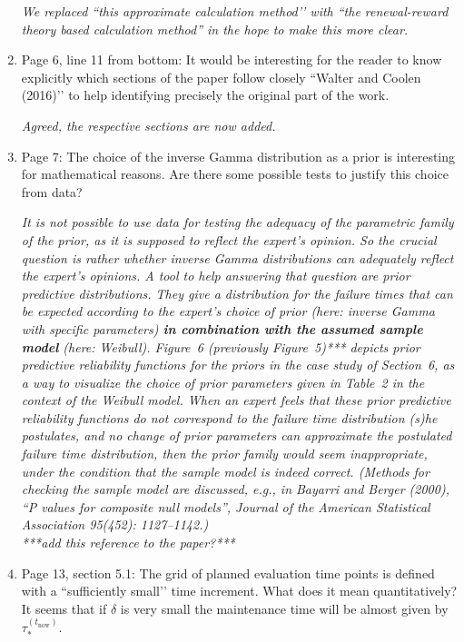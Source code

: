 \documentclass[authoryear]{elsarticle}
\def\tnow{t_\text{now}}
\begin{document}
\begin{enumerate}
\smallskip

\emph{We replaced ``this approximate calculation method’’ with ``the renewal-reward theory based calculation method''
in the hope to make this more clear.}

\item Page 6, line 11 from bottom: It would be interesting for the reader to know explicitly which sections of the paper follow closely ``Walter and Coolen (2016)’’ to help identifying precisely the original part of the work. 

\smallskip

\emph{Agreed, the respective sections are now added.}

\item Page 7: The choice of the inverse Gamma distribution as a prior is interesting for mathematical reasons. Are there some possible tests to justify this choice from data?

\smallskip

\emph{It is not possible to use data for testing the adequacy of the parametric family of the prior,
as it is supposed to reflect the expert's opinion.
So the crucial question is rather whether inverse Gamma distributions can adequately reflect the expert's opinions.
A tool to help answering that question are prior predictive distributions.
They give a distribution for the failure times that can be expected according to the expert's choice of prior
(here: inverse Gamma with specific parameters)
\textbf{in combination with the assumed sample model} (here: Weibull).
Figure~6 (previously Figure~5)*** depicts prior predictive reliability functions for the priors in the case study of Section~6,
as a way to visualize the choice of prior parameters given in Table~2 in the context of the Weibull model.
When an expert feels that these prior predictive reliability functions do not correspond to the failure time distribution (s)he postulates,
and no change of prior parameters can approximate the postulated failure time distribution,
then the prior family would seem inappropriate,
under the condition that the sample model is indeed correct.
(Methods for checking the sample model are discussed, e.g., in
Bayarri and Berger (2000), ``P values for composite null models'',
Journal of the American Statistical Association 95(452): 1127–1142.)\\
***add this reference to the paper?***}

\item Page 13, section 5.1: The grid of planned evaluation time points is defined with a ``sufficiently small’’ time increment. What does it mean quantitatively? It seems that if $\delta$ is very small the maintenance time will be almost given by $\tau_*^{(\tnow)}$.


\end{enumerate}
\end{document}
